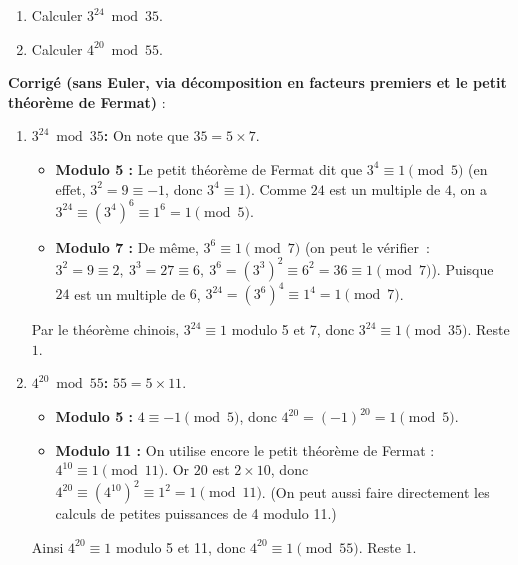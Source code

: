 \documentclass[a4paper,12pt]{article}
\begin{document}
    
    \begin{exercice}[title=Exercice 19 $\star\star$ { [Calculer] }]{}{}
    \begin{enumerate}
      \item Calculer $3^{24} \bmod 35$.
      \item Calculer $4^{20} \bmod 55$.
    \end{enumerate}
    \end{exercice}
    
    \begin{solutionbox}
    \textbf{Corrigé (sans Euler, via décomposition en facteurs premiers et le petit théorème de Fermat)} :
    
    \begin{enumerate}
      \item \textbf{$3^{24} \bmod 35$:}  
      On note que $35 = 5 \times 7$.  
      \begin{itemize}
        \item \textbf{Modulo 5 :} 
          Le petit théorème de Fermat dit que $3^4 \equiv 1 \pmod{5}$ (en effet, $3^2=9\equiv -1$, donc $3^4\equiv 1$).  
          Comme $24$ est un multiple de $4$, on a $3^{24} \equiv (3^4)^6 \equiv 1^6 = 1 \pmod{5}$.
        \item \textbf{Modulo 7 :} 
          De même, $3^6 \equiv 1 \pmod{7}$ (on peut le vérifier : $3^2=9\equiv 2,\ 3^3=27\equiv 6,\ 3^6=(3^3)^2\equiv 6^2=36\equiv 1\pmod7$).  
          Puisque $24$ est un multiple de $6$, $3^{24} = (3^6)^4 \equiv 1^4 = 1 \pmod{7}$.
      \end{itemize}
      Par le théorème chinois, $3^{24}\equiv 1$ modulo 5 et 7, donc $3^{24}\equiv 1 \pmod{35}$.  
      Reste $1$.
    
      \item \textbf{$4^{20} \bmod 55$:}  
      $55 = 5 \times 11$.  
      \begin{itemize}
        \item \textbf{Modulo 5 :} 
          $4 \equiv -1 \pmod{5}$, donc $4^{20} = (-1)^{20} = 1 \pmod{5}$.
        \item \textbf{Modulo 11 :} 
          On utilise encore le petit théorème de Fermat : $4^{10} \equiv 1 \pmod{11}$.  
          Or $20$ est $2\times10$, donc $4^{20}\equiv (4^{10})^2\equiv 1^2=1 \pmod{11}$.  
          (On peut aussi faire directement les calculs de petites puissances de 4 modulo 11.)
      \end{itemize}
      Ainsi $4^{20}\equiv 1$ modulo 5 et 11, donc $4^{20}\equiv 1 \pmod{55}$.  
      Reste $1$.
    \end{enumerate}
    \end{solutionbox}
    
\end{document}

